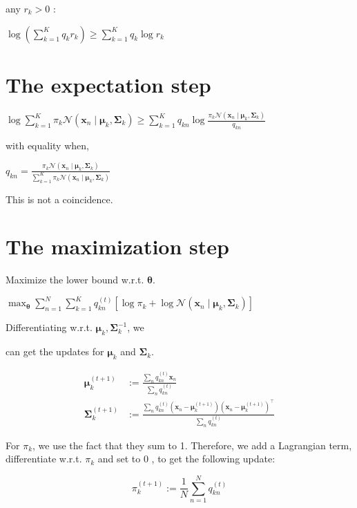 any $r_{k}>0$ :

$\log \left(\sum_{k=1}^{K} q_{k} r_{k}\right) \geq \sum_{k=1}^{K} q_{k} \log r_{k}$

\section*{The expectation step}
$\log \sum_{k=1}^{K} \pi_{k} \mathcal{N}\left(\mathbf{x}_{n} \mid \boldsymbol{\mu}_{k}, \boldsymbol{\Sigma}_{k}\right) \geq \sum_{k=1}^{K} q_{k n} \log \frac{\pi_{k} \mathcal{N}\left(\mathbf{x}_{n} \mid \boldsymbol{\mu}_{k}, \boldsymbol{\Sigma}_{k}\right)}{q_{k n}}$

with equality when,

$q_{k n}=\frac{\pi_{k} \mathcal{N}\left(\mathbf{x}_{n} \mid \boldsymbol{\mu}_{k}, \boldsymbol{\Sigma}_{k}\right)}{\sum_{k=1}^{K} \pi_{k} \mathcal{N}\left(\mathbf{x}_{n} \mid \boldsymbol{\mu}_{k}, \boldsymbol{\Sigma}_{k}\right)}$

This is not a coincidence.

\section*{The maximization step}
Maximize the lower bound w.r.t. $\boldsymbol{\theta}$.

$\max _{\boldsymbol{\theta}} \sum_{n=1}^{N} \sum_{k=1}^{K} q_{k n}^{(t)}\left[\log \pi_{k}+\log \mathcal{N}\left(\mathbf{x}_{n} \mid \boldsymbol{\mu}_{k}, \boldsymbol{\Sigma}_{k}\right)\right]$

Differentiating w.r.t. $\boldsymbol{\mu}_{k}, \boldsymbol{\Sigma}_{k}^{-1}$, we

can get the updates for $\boldsymbol{\mu}_{k}$ and $\boldsymbol{\Sigma}_{k}$.

$$
\begin{aligned}
\boldsymbol{\mu}_{k}^{(t+1)} & :=\frac{\sum_{n} q_{k n}^{(t)} \mathbf{x}_{n}}{\sum_{n} q_{k n}^{(t)}} \\
\boldsymbol{\Sigma}_{k}^{(t+1)} & :=\frac{\sum_{n} q_{k n}^{(t)}\left(\mathbf{x}_{n}-\boldsymbol{\mu}_{k}^{(t+1)}\right)\left(\mathbf{x}_{n}-\boldsymbol{\mu}_{k}^{(t+1)}\right)^{\top}}{\sum_{n} q_{k n}^{(t)}}
\end{aligned}
$$

For $\pi_{k}$, we use the fact that they sum to 1. Therefore, we add a Lagrangian term, differentiate w.r.t. $\pi_{k}$ and set to 0 , to get the following update:

$$
\pi_{k}^{(t+1)}:=\frac{1}{N} \sum_{n=1}^{N} q_{k n}^{(t)}
$$


